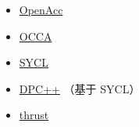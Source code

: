

\begin{itemize}
\item \href{https://www.openacc.org/}{OpenAcc}
\item \href{https://libocca.org/}{OCCA}
\item \href{https://www.khronos.org/api/index_2017/sycl}{SYCL}
\item \href{https://www.intel.com/content/www/us/en/developer/tools/oneapi/dpc-compiler.html#gs.5ytas2}{DPC++} （基于 SYCL）
\item \href{https://developer.nvidia.com/thrust}{thrust}
\end{itemize}
